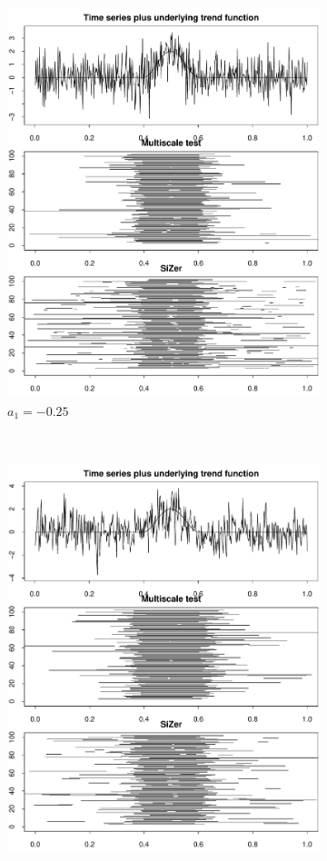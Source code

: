 \documentclass[a4paper,12pt]{article}
\begin{document}
\begin{figure}
\begin{subfigure}{.5\textwidth}
  \includegraphics[width=.9\linewidth]{Plots/min_int_with_T_500_a1_-25.pdf}
  \caption{$a_1 = -0.25$}
  \label{fig:sfig2}
\end{subfigure}\\
\begin{subfigure}{.5\textwidth}
  \centering
  \includegraphics[width=.9\linewidth]{Plots/min_int_with_T_500_a1_25.pdf}

\end{subfigure}
\end{figure}
\end{document}
